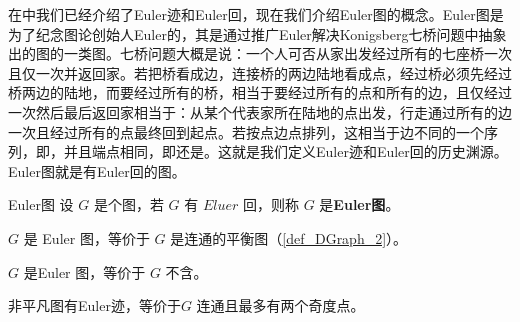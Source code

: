 
\cite{graph2}在中我们已经介绍了Euler迹和Euler回，现在我们介绍Euler图的概念。Euler图是为了纪念图论创始人Euler的，其是通过推广Euler解决Konigsberg七桥问题中抽象出的图的一类图。七桥问题大概是说：一个人可否从家出发经过所有的七座桥一次且仅一次并返回家。若把桥看成边，连接桥的两边陆地看成点，经过桥必须先经过桥两边的陆地，而要经过所有的桥，相当于要经过所有的点和所有的边，且仅经过一次然后最后返回家相当于：从某个代表家所在陆地的点出发，行走通过所有的边一次且经过所有的点最终回到起点。若按点边点排列，这相当于边不同的一个序列，即，并且端点相同，即还是。这就是我们定义Euler迹和Euler回的历史渊源。Euler图就是有Euler回的图。

\begin{definition}{Euler图}
设 $G$ 是个图，若 $G$ 有 $Eluer$ 回，则称 $G$ 是\textbf{Euler图}。
\end{definition}

\begin{theorem}{}
$G$ 是 Euler 图，等价于 $G$ 是连通的平衡图（\autoref{def_DGraph_2}）。
\end{theorem}

\begin{corollary}{}
$G$ 是Euler 图，等价于 $G$ 不含。
\end{corollary}

\begin{corollary}{}
非平凡图有Euler迹，等价于$G$ 连通且最多有两个奇度点。
\end{corollary}
